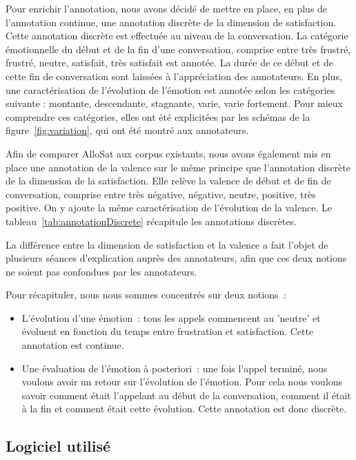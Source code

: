 Pour enrichir l'annotation, nous avons décidé de mettre en place, en plus de l'annotation continue, une annotation discrète de la dimension de satisfaction. Cette annotation discrète est effectuée au niveau de la conversation. La catégorie émotionnelle du début et de la fin d'une conversation, comprise entre très frustré, frustré, neutre, satisfait, très satisfait est annotée. La durée de ce début et de cette fin de conversation sont laissées à l'appréciation des annotateurs. En plus, une caractérisation de l'évolution de l'émotion est annotée selon les catégories suivante : montante, descendante, stagnante, varie, varie fortement. Pour mieux comprendre ces catégories, elles ont été explicitées par les schémas de la figure~\ref{fig:variation}, qui ont été montré aux annotateurs.



Afin de comparer AlloSat aux corpus existants, nous avons également mis en place une annotation de la valence sur le même principe que l'annotation discrète de la dimension de la satisfaction. Elle relève la valence de début et de fin de conversation, comprise entre très négative, négative, neutre, positive, très positive. On y ajoute la même caractérisation de l'évolution de la valence. Le tableau~\ref{tab:annotationDiscrete} récapitule les annotations discrètes.



La différence entre la dimension de satisfaction et la valence a fait l'objet de plusieurs séances d'explication auprès des annotateurs, afin que ces deux notions ne soient pas confondues par les annotateurs.

Pour récapituler, nous nous sommes concentrés sur deux notions :
\begin{itemize}
  \item L'évolution d'une émotion : tous les appels commencent au 'neutre' et évoluent en fonction du temps entre frustration et satisfaction. Cette annotation est continue.
  \item Une évaluation de l'émotion à posteriori : une fois l'appel terminé, nous voulons avoir un retour sur l'évolution de l'émotion. Pour cela nous voulons savoir comment était l'appelant au début de la conversation, comment il était à la fin et comment était cette évolution. Cette annotation est donc discrète.
\end{itemize}

\subsection{Logiciel utilisé}

